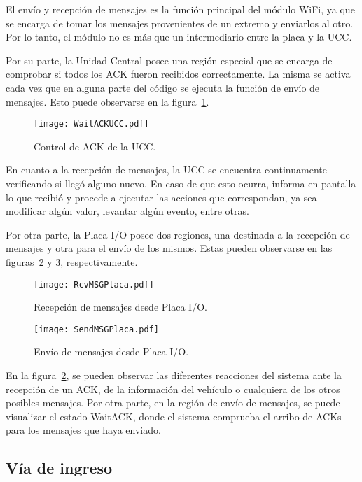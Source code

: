 El envío y recepción de mensajes es la función principal del módulo WiFi, ya que se encarga de tomar los mensajes provenientes de un extremo y enviarlos al otro. Por lo tanto, el módulo no es más que un intermediario entre la placa y la UCC.

Por su parte, la Unidad Central posee una región especial que se encarga de comprobar si todos los ACK fueron recibidos correctamente.  La misma se activa cada vez que en alguna parte del código se ejecuta la función de envío de mensajes. Esto puede observarse en la figura~\ref{fig:img_WaitACKUCC}.

\begin{figure}[H]
	\centering
	\texttt{[image: WaitACKUCC.pdf]}
	\caption{Control de ACK de la UCC.}
	\label{fig:img_WaitACKUCC}
\end{figure}

En cuanto a la recepción de mensajes, la UCC se encuentra continuamente verificando si llegó alguno nuevo. En caso de que esto ocurra, informa en pantalla lo que recibió y procede a ejecutar las acciones que correspondan, ya sea modificar algún valor, levantar algún evento, entre otras.

Por otra parte, la Placa I/O posee dos regiones, una destinada a la recepción de mensajes y otra para el envío de los mismos. Estas pueden observarse en las figuras~\ref{fig:img_RcvMSGPlaca} y \ref{fig:img_SendMSGPlaca}, respectivamente.

\begin{figure}[H]
	\centering
	\texttt{[image: RcvMSGPlaca.pdf]}
	\caption{Recepción de mensajes desde Placa I/O.}
	\label{fig:img_RcvMSGPlaca}
\end{figure}

\begin{figure}[H]
	\centering
	\texttt{[image: SendMSGPlaca.pdf]}
	\caption{Envío de mensajes desde Placa I/O.}
	\label{fig:img_SendMSGPlaca}
\end{figure}

En la figura~\ref{fig:img_RcvMSGPlaca}, se pueden observar las diferentes reacciones del sistema ante la recepción de un ACK, de la información del vehículo o cualquiera de los otros posibles mensajes. Por otra parte, en la región de envío de mensajes, se puede visualizar el estado WaitACK, donde el sistema comprueba el arribo de ACKs para los mensajes que haya enviado.


\subsection{Vía de ingreso}

